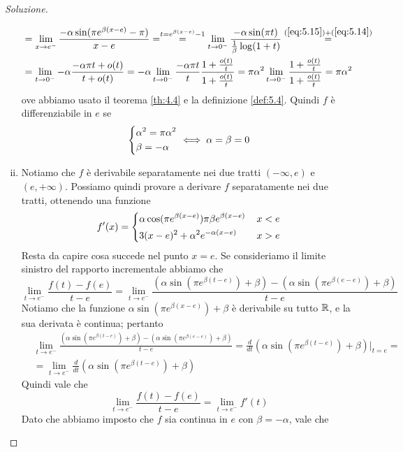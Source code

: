 \begin{proof}[Soluzione]
\begin{enumerate}[(i)]
\[\begin{split}
            & = \lim_{x\to e^-} \frac{-\alpha\sin(\pi e^{\beta(x-e)}-\pi)}{x-e}= \overset{t=e^{\beta(x-e)}-1}{=} \lim_{t\to 0^-} \frac{-\alpha\sin(\pi t)}{\frac{1}{\beta}\log(1+t)} \overset{(\ref{eq:5.15})+(\ref{eq:5.14})}{=} \\
            & = \lim_{t\to 0^-} -\alpha\frac{-\alpha\pi t +o(t)}{t+o(t)} = -\alpha\lim_{t\to 0^-} \frac{-\alpha \pi t}{t}\frac{1+\frac{o(t)}{t}}{1+\frac{o(t)}{t}} = \pi \alpha^2 \lim_{t\to 0^-} \frac{1+\frac{o(t)}{t}}{1+\frac{o(t)}{t}} = \pi \alpha^2
        \end{split}
        \]
        ove abbiamo usato il teorema \ref{th:4.4} e la definizione \ref{def:5.4}. Quindi $f$ è differenziabile in $e$ se
        \[
        \begin{dcases}
            \alpha^2 = \pi \alpha^2 \\
            \beta = -\alpha 
        \end{dcases} \iff \alpha = \beta = 0
        \]
        \item Notiamo che $f$ è derivabile separatamente nei due tratti $(-\infty, e)$ e $(e, +\infty)$. Possiamo quindi provare a derivare $f$ separatamente nei due tratti, ottenendo una funzione
        \[
        f'(x) = \begin{dcases}
            \alpha \cos(\pi e^{\beta(x-e)})\pi \beta e^{\beta(x-e)}\, & x<e\\
            3(x-e)^2 + \alpha^2 e^{-\alpha(x-e)}\, & x>e
        \end{dcases}
        \]
        Resta da capire cosa succede nel punto $x=e$. Se consideriamo il limite sinistro del rapporto incrementale abbiamo che
        \[
        \lim_{t\to e^-} \frac{f(t)-f(e)}{t-e} = \lim_{t\to e^-}\frac{(\alpha\sin(\pi e^{\beta(t-e)})+\beta)-(\alpha\sin(\pi e^{\beta(e-e)})+\beta)}{t-e}
        \]
        Notiamo che la funzione $\alpha\sin(\pi e^{\beta(x-e)})+\beta$ è derivabile su tutto $\amsbb{R}$, e la sua derivata è continua; pertanto
        \[
        \begin{split}
            &\lim_{t\to e^-}\frac{(\alpha\sin(\pi e^{\beta(t-e)})+\beta)-(\alpha\sin(\pi e^{\beta(e-e)})+\beta)}{t-e} = \frac{d}{dt}\left(\alpha\sin(\pi e^{\beta(t-e)})+\beta\right)\bigg|_{t=e} = \\
            & = \lim_{t\to e^-} \frac{d}{dt}\left(\alpha\sin(\pi e^{\beta(t-e)})+\beta\right)
        \end{split}
        \]
        Quindi vale che
        \[
        \lim_{t\to e^-} \frac{f(t)-f(e)}{t-e} = \lim_{t\to e^-} f'(t)
        \]
        Dato che abbiamo imposto che $f$ sia continua in $e$ con $\beta = -\alpha$, vale che 

\end{enumerate}
\end{proof}
